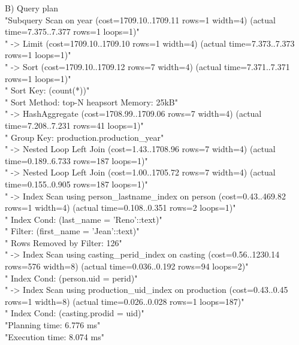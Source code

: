 \documentclass{article}
\begin{document}
B) Query plan \\
"Subquery Scan on year  (cost=1709.10..1709.11 rows=1 width=4) (actual time=7.375..7.377 rows=1 loops=1)"\\
"  ->  Limit  (cost=1709.10..1709.10 rows=1 width=4) (actual time=7.373..7.373 rows=1 loops=1)"\\
"        ->  Sort  (cost=1709.10..1709.12 rows=7 width=4) (actual time=7.371..7.371 rows=1 loops=1)"\\
"              Sort Key: (count(*))"\\
"              Sort Method: top-N heapsort  Memory: 25kB"\\
"              ->  HashAggregate  (cost=1708.99..1709.06 rows=7 width=4) (actual time=7.208..7.231 rows=41 loops=1)"\\
"                    Group Key: production.production_year"\\
"                    ->  Nested Loop Left Join  (cost=1.43..1708.96 rows=7 width=4) (actual time=0.189..6.733 rows=187 loops=1)"\\
"                          ->  Nested Loop Left Join  (cost=1.00..1705.72 rows=7 width=4) (actual time=0.155..0.905 rows=187 loops=1)"\\
"                                ->  Index Scan using person_lastname_index on person  (cost=0.43..469.82 rows=1 width=4) (actual time=0.108..0.351 rows=2 loops=1)"\\
"                                      Index Cond: (last_name = 'Reno'::text)"\\
"                                      Filter: (first_name = 'Jean'::text)"\\
"                                      Rows Removed by Filter: 126"\\
"                                ->  Index Scan using casting_perid_index on casting  (cost=0.56..1230.14 rows=576 width=8) (actual time=0.036..0.192 rows=94 loops=2)"\\
"                                      Index Cond: (person.uid = perid)"\\
"                          ->  Index Scan using production_uid_index on production  (cost=0.43..0.45 rows=1 width=8) (actual time=0.026..0.028 rows=1 loops=187)"\\
"                                Index Cond: (casting.prodid = uid)"\\
"Planning time: 6.776 ms"\\
"Execution time: 8.074 ms"\\
\end{document}
